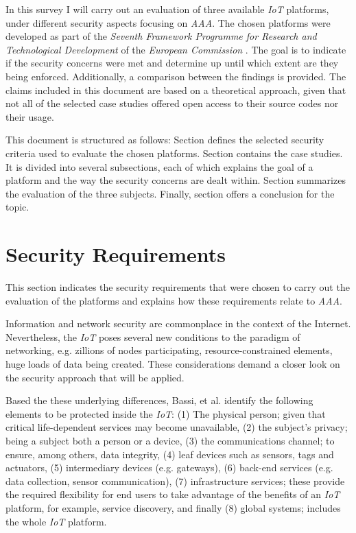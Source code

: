 \documentclass[journal]{IEEEtran}
\begin{document}
  In this survey I will carry out an evaluation of three available \emph{IoT} platforms, under different security aspects focusing on \emph{AAA}. The chosen platforms were developed as part of the \emph{Seventh Framework Programme for Research and Technological Development} of the \emph{European Commission} \cite{FP7}. The goal is to indicate if the security concerns were met and determine up until which extent are they being enforced. Additionally, a comparison between the findings is provided. The claims included in this document are based on a theoretical approach, given that not all of the selected case studies offered open access to their source codes nor their usage.

  This document is structured as follows: Section \uppercase\expandafter{} defines the selected security criteria used to evaluate the chosen platforms. Section \uppercase\expandafter{} contains the case studies. It is divided into several subsections, each of which explains the goal of a platform and the way the security concerns are dealt within. Section \uppercase\expandafter{} summarizes the evaluation of the three subjects. Finally, section \uppercase\expandafter{} offers a conclusion for the topic.

\section{Security Requirements} \label{sec_security_requirements}
  This section indicates the security requirements that were chosen to carry out the evaluation of the platforms and explains how these requirements relate to \emph{AAA}.

  Information and network security are commonplace in the context of the Internet. Nevertheless, the \emph{IoT} poses several new conditions to the paradigm of networking, e.g. zillions of nodes participating, resource-constrained elements, huge loads of data being created. These considerations demand a closer look on the security approach that will be applied.

  Based the these underlying differences, Bassi, et al. \cite{Bassi2013} identify the following elements to be protected inside the \emph{IoT}: (1) The physical person; given that critical life-dependent services may become unavailable, (2) the subject's privacy; being a subject both a person or a device, (3) the communications channel; to ensure, among others, data integrity, (4) leaf devices such as sensors, tags and actuators, (5) intermediary devices (e.g. gateways), (6) back-end services (e.g. data collection, sensor communication), (7) infrastructure services; these provide the required flexibility for end users to take advantage of the benefits of an \emph{IoT} platform, for example, service discovery, and finally (8) global systems; includes the whole \emph{IoT} platform.
\end{document}
